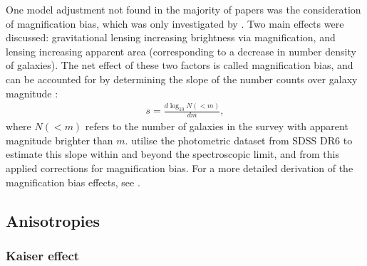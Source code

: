 \documentclass[titlesmallcaps, examinerscopy, copyrightpage]{uqthesis}
\begin{document}
One model adjustment not found in the majority of papers was the consideration of magnification bias, which was only investigated by  \citet{Gaztanaga2009}. Two main effects were discussed: gravitational lensing increasing brightness via magnification, and lensing increasing apparent area (corresponding to a decrease in number density of galaxies). The net effect of these two factors is called magnification bias, and can be accounted for by determining the slope of the number counts over galaxy magnitude \citep{TurnerOstriker1984,  WebsterHewett1988, Fugmann1988, Narayan1989, Schneider1989, BroadhurstTaylor1995, MoessnerJain1998}:
\begin{align}
s = \frac{d \log_{10} N(<m)}{dm},
\end{align}
where $N(<m)$ refers to the number of galaxies in the survey with apparent magnitude brighter than $m$. \citet{Gaztanaga2009} utilise the photometric dataset from SDSS DR6 \citep[DR6:][]{Adelman2008} to estimate this slope within and beyond the spectroscopic limit, and from this applied corrections for magnification bias. For a more detailed derivation of the magnification bias effects, see \citet[\S 2.2]{Gaztanaga2009}.


\subsection{Anisotropies}

\subsubsection{Kaiser effect}
\end{document}
